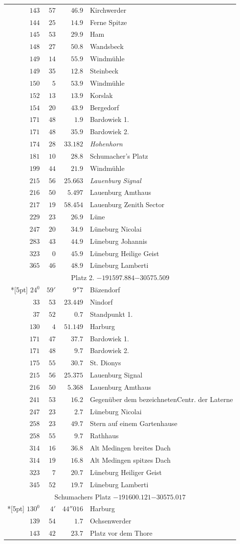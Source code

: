 \begin{longtable}{@{}rrrp{.61\linewidth}@{}}
\(143\)&\(57\)&\(46.9\)&\raggedright Kirchwerder\tabularnewline
\(144\)&\(25\)&\(14.9\)&\raggedright Ferne Spitze\tabularnewline
\(145\)&\(53\)&\(29.9\)&\raggedright Ham\tabularnewline
\(148\)&\(27\)&\(50.8\)&\raggedright Wandsbeck\tabularnewline
\(149\)&\(14\)&\(55.9\)&\raggedright Windmühle\tabularnewline
\(149\)&\(35\)&\(12.8\)&\raggedright Steinbeck\tabularnewline
\(150\)&\(5\)&\(53.9\)&\raggedright Windmühle\tabularnewline
\(152\)&\(13\)&\(13.9\)&\raggedright Korslak\tabularnewline
\(154\)&\(20\)&\(43.9\)&\raggedright Bergedorf\tabularnewline
\(171\)&\(48\)&\(1.9\)&\raggedright Bardowiek 1.\tabularnewline
\(171\)&\(48\)&\(35.9\)&\raggedright Bardowiek 2.\tabularnewline
\(174\)&\(28\)&\(33.182\)&\raggedright \textit{Hohenhorn}\tabularnewline
\(181\)&\(10\)&\(28.8\)&\raggedright Schumacher’s Platz\tabularnewline
\(199\)&\(44\)&\(21.9\)&\raggedright Windmühle\tabularnewline
\(215\)&\(56\)&\(25.663\)&\raggedright \textit{Lauenburg Signal}\tabularnewline
\(216\)&\(50\)&\(5.497\)&\raggedright Lauenburg Amthaus\tabularnewline
\(217\)&\(19\)&\(58.454\)&\raggedright Lauenburg Zenith Sector\tabularnewline
\(229\)&\(23\)&\(26.9\)&\raggedright Lüne\tabularnewline
\(247\)&\(20\)&\(34.9\)&\raggedright Lüneburg Nicolai\tabularnewline
\(283\)&\(43\)&\(44.9\)&\raggedright Lüneburg Johannis\tabularnewline
\(323\)&\(0\)&\(45.9\)&\raggedright Lüneburg Heilige Geist\tabularnewline
\(365\)&\(46\)&\(48.9\)&\raggedright Lüneburg Lamberti\tabularnewline
\multicolumn{4}{c}{Platz 2. \(-191597.884\)\qquad\(-30575.509\)}\\*[5pt]
\(24^{0}\)&\(59'\)&\(9''7\)&\raggedright Bäzendorf\tabularnewline
\(33\)&\(53\)&\(23.449\)&\raggedright Nindorf\tabularnewline
\(37\)&\(52\)&\(0.7\)&\raggedright Standpunkt 1.\tabularnewline
\(130\)&\(4\)&\(51.149\)&\raggedright Harburg\tabularnewline
\(171\)&\(47\)&\(37.7\)&\raggedright Bardowiek 1.\tabularnewline
\(171\)&\(48\)&\(9.7\)&\raggedright Bardowiek 2.\tabularnewline
\(175\)&\(55\)&\(30.7\)&\raggedright St. Dionys\tabularnewline
\(215\)&\(56\)&\(25.375\)&\raggedright Lauenburg Signal\tabularnewline
\(216\)&\(50\)&\(5.368\)&\raggedright Lauenburg Amthaus\tabularnewline
\(241\)&\(53\)&\(16.2\)&\raggedright Gegenüber dem bezeichnetenCentr. der Laterne\tabularnewline
\(247\)&\(23\)&\(2.7\)&\raggedright Lüneburg Nicolai\tabularnewline
\(258\)&\(23\)&\(49.7\)&\raggedright Stern auf einem Gartenhause\tabularnewline
\(258\)&\(55\)&\(9.7\)&\raggedright Rathhaus\tabularnewline
\(314\)&\(16\)&\(36.8\)&\raggedright Alt Medingen breites Dach\tabularnewline
\(314\)&\(19\)&\(16.8\)&\raggedright Alt Medingen spitzes Dach\tabularnewline
\(323\)&\(7\)&\(20.7\)&\raggedright Lüneburg Heiliger Geist\tabularnewline
\(345\)&\(52\)&\(19.7\)&\raggedright Lüneburg Lamberti\tabularnewline
\multicolumn{4}{c}{Schumachers Platz \(-191600.121\)\qquad\(-30575.017\)}\\*[5pt]
\(130^{0}\)&\(4'\)&\(44''016\)&\raggedright Harburg\tabularnewline
\(139\)&\(54\)&\(1.7\)&\raggedright Ochsenwerder\tabularnewline
\(143\)&\(42\)&\(23.7\)&\raggedright Platz vor dem Thore\tabularnewline
\end{longtable}
\endgroup
